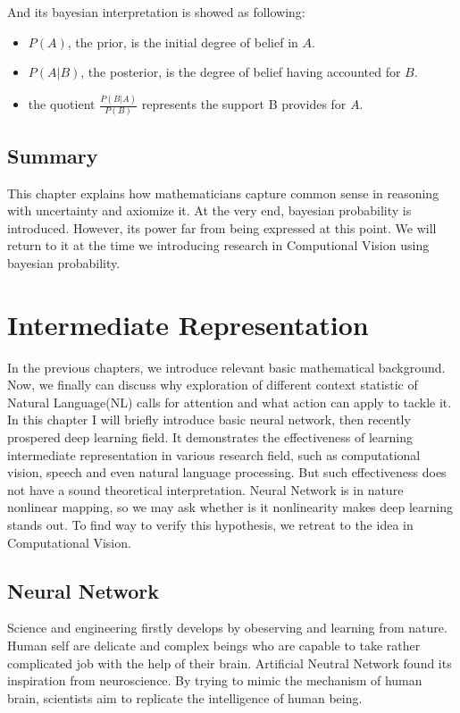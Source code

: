 \documentclass[a4paper]{book}
\begin{document}
    And its bayesian interpretation is showed as following: 

    \begin{itemize}
      \item $P(A)$, the prior, is the initial degree of belief in $A$.
      \item $P(A|B)$, the posterior, is the degree of belief having
        accounted for $B$.
      \item the quotient $\frac{P(B|A)}{P(B)}$ represents the support B
        provides for $A$.
    \end{itemize}

    \section{Summary}
    This chapter explains how mathematicians capture common sense in
    reasoning with uncertainty and axiomize it. At the very end,
    bayesian probability is introduced. However, its power far from
    being expressed at this point. We will return to it at the time we
    introducing research in Computional Vision using bayesian
    probability.

\chapter{Intermediate Representation}
\label{chp:intermediate_representation}

In the previous chapters, we introduce relevant basic mathematical
background. Now, we finally can discuss why exploration of different
context statistic of Natural Language(NL) calls for attention and what
action can apply to tackle it. In this chapter I will briefly introduce
basic neural network, then recently prospered deep learning field. It
demonstrates the effectiveness of learning intermediate representation
in various research field, such as computational vision, speech and even
natural language processing. But such effectiveness does not have a
sound theoretical interpretation. Neural Network is in nature nonlinear
mapping, so we may ask whether is it nonlinearity makes deep learning
stands out. To find way to verify this hypothesis, we retreat to the
idea in Computational Vision.

  \section{Neural Network\cite{Samarasinghe2006}}
  Science and engineering firstly develops by obeserving and learning
  from nature. Human self are delicate and complex beings who are
  capable to take rather complicated job with the help of their brain.
  Artificial Neutral Network found its inspiration from neuroscience.
  By trying to mimic the mechanism of human brain, scientists aim to
  replicate the intelligence of human being.
\end{document}
